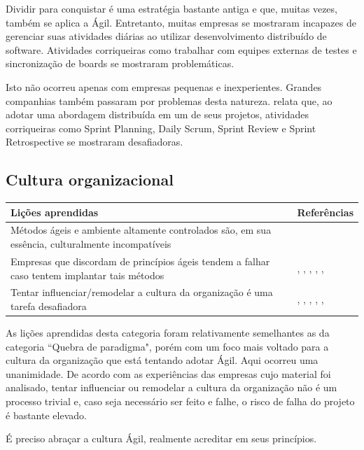 Dividir para conquistar é uma estratégia bastante antiga e que, muitas vezes, também se aplica a Ágil. Entretanto, muitas empresas se mostraram incapazes de gerenciar suas atividades diárias ao utilizar desenvolvimento distribuído de software. Atividades corriqueiras como trabalhar com equipes externas de testes \cite{Bastos2013} e sincronização de boards \cite{Vieira2013} se mostraram problemáticas.

Isto não ocorreu apenas com empresas pequenas e inexperientes. Grandes companhias também passaram por problemas desta natureza. \cite{Adobe2012} relata que, ao adotar uma abordagem distribuída em um de seus projetos, atividades corriqueiras como Sprint Planning, Daily Scrum, Sprint Review e Sprint Retrospective se mostraram desafiadoras.

\subsection{Cultura organizacional}

\begin{table}[H]
	\centering
	\begin{tabularx}{\linewidth}{ | X | p{5cm} | } \hline \textbf{Lições aprendidas} & \textbf{Referências} \\ \hline
		Métodos ágeis e ambiente altamente controlados são, em sua essência, culturalmente incompatíveis & \cite{Fitzgerald2013} \\ \hline
		Empresas que discordam de princípios ágeis tendem a falhar caso tentem implantar tais métodos & \cite{Bustard2013}, \cite{Microsoft2013}, \cite{Claudia2013}, \cite{Nokia2013}, \cite{Sahota2012}, \cite{Maciel2013} \\ \hline
		Tentar influenciar/remodelar a cultura da organização é uma tarefa desafiadora & \cite{Eunha2012}, \cite{Rodrigues2013}, \cite{Bastos2013}, \cite{Sahota2012}, \cite{Srinath2012}, \cite{Maciel2013} \\ \hline
	\end{tabularx}
\end{table}

As lições aprendidas desta categoria foram relativamente semelhantes as da categoria ``Quebra de paradigma", porém com um foco mais voltado para a cultura da organização que está tentando adotar Ágil. Aqui ocorreu uma unanimidade. De acordo com as experiências das empresas cujo material foi analisado, tentar influenciar ou remodelar a cultura da organização não é um processo trivial e, caso seja necessário ser feito e falhe, o risco de falha do projeto é bastante elevado.

É preciso abraçar a cultura Ágil, realmente acreditar em seus princípios.
